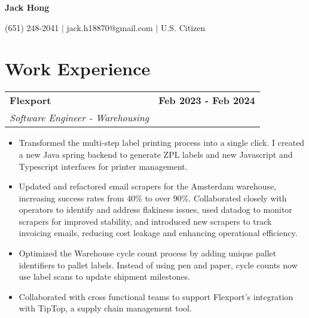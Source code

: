 \documentclass[11pt]{extreport}
\makeatletter
\newcommand{\resumeSubheading}[4]{
  \vspace{-1pt}
    \begin{tabular*}{1.0\textwidth}{l@{\extracolsep{\fill}}r}
      \textbf{#1} & \textbf{#2}  \vspace{1mm} \\
      {#3} & \textbf{#4} \\
    \end{tabular*}\vspace{-3pt}
}
\makeatother
\begin{document}
\vspace*{-40pt}
\begin{center}
	\textbf{{\LARGE Jack Hong}} \\
	      \vspace{2mm}

    (651) 248-2041 $|$ jack.h18870@gmail.com $|$ U.S. Citizen
\end{center}
\vspace{-4mm}

\section{Work Experience}
\resumeSubheading{Flexport}{Feb 2023 - Feb 2024}
    {\textit{Software Engineer - Warehousing}}{}
    \vspace{-2mm}
    \begin{itemize}
    \item[\textperiodcentered] Transformed the multi-step label printing process into a single click. I created a new Java spring backend to generate ZPL labels and new Javascript and Typescript interfaces for printer management.
        \vspace{-2mm}

    \item[\textperiodcentered] Updated and refactored email scrapers for the Amsterdam warehouse, increasing success rates from 40\% to over 90\%. Collaborated closely with operators to identify and address flakiness issues, used datadog to monitor scrapers for improved stability, and introduced new scrapers to track invoicing emails, reducing cost leakage and enhancing operational efficiency. 
            \vspace{-2mm}

   \item[\textperiodcentered] Optimized the Warehouse cycle count process by adding unique pallet identifiers to pallet labels. Instead of using pen and paper, cycle counts now use label scans to update shipment milestones.
           \vspace{-2mm}

   \item[\textperiodcentered] Collaborated with cross functional teams to support Flexport's integration with TipTop, a supply chain management tool. 
    \end{itemize}
\end{document}
